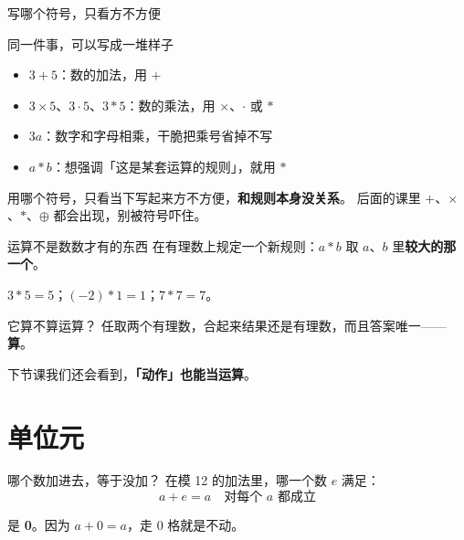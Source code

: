 \documentclass[10pt]{beamer}
\begin{document}
\begin{frame}{写哪个符号，只看方不方便}
  \begin{block}{同一件事，可以写成一堆样子}
    \begin{itemize}
      \item \(3+5\)：数的加法，用 \(+\)
      \item \(3\times5\)、\(3\cdot5\)、\(3*5\)：数的乘法，用 \(\times\)、\(\cdot\) 或 \(*\)
      \item \(3a\)：数字和字母相乘，干脆把乘号省掉不写
      \item \(a*b\)：想强调「这是某套运算的规则」，就用 \(*\)
    \end{itemize}
  \end{block}
  \pause
  \begin{att}
    用哪个符号，只看当下写起来方不方便，\textbf{和规则本身没关系}。
    后面的课里 \(+\)、\(\times\)、\(*\)、\(\oplus\) 都会出现，别被符号吓住。
  \end{att}
\end{frame}

\begin{frame}{运算不是数数才有的东西}
  在有理数上规定一个新规则：\(a*b\) 取 \(a\)、\(b\) 里\textbf{较大的那一个}。
  \begin{example}
    \(3*5=5\)；\quad \((-2)*1=1\)；\quad \(7*7=7\)。
  \end{example}
  \pause
  \begin{block}{它算不算运算？}
    任取两个有理数，合起来结果还是有理数，而且答案唯一——\textbf{算}。
  \end{block}
  \pause
  \begin{center}
    {\large 下节课我们还会看到，\textbf{「动作」也能当运算}。}
  \end{center}
\end{frame}

\section{单位元}

\begin{frame}{哪个数加进去，等于没加？}
  在模 12 的加法里，哪一个数 \(e\) 满足：
  \[
    a + e = a \quad\text{对每个 } a \text{ 都成立}
  \]
  \pause
  \begin{center}
    {\large 是 \textbf{0}。}\quad 因为 \(a+0 = a\)，走 0 格就是不动。
  \end{center}
\end{frame}
\end{document}
